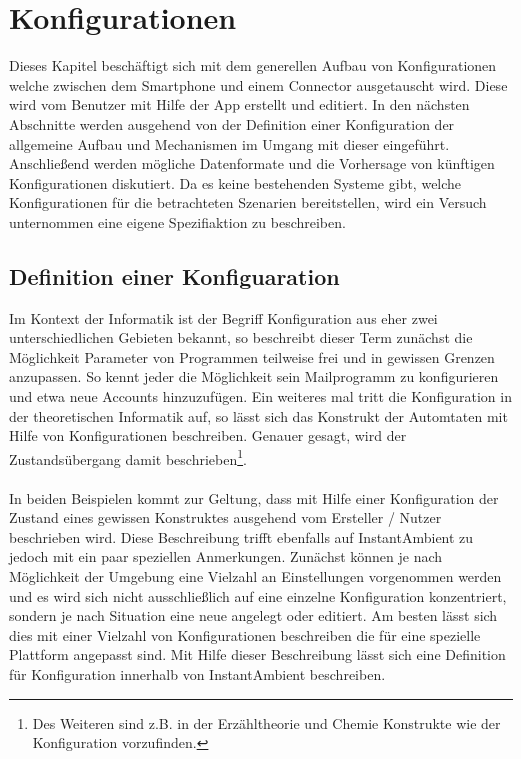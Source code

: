 \chapter{Konfigurationen}

Dieses Kapitel beschäftigt sich mit dem generellen Aufbau von Konfigurationen welche zwischen dem Smartphone und einem Connector ausgetauscht wird. Diese wird vom Benutzer
mit Hilfe der App erstellt und editiert. In den nächsten Abschnitte werden ausgehend von der Definition einer Konfiguration der allgemeine Aufbau und Mechanismen im Umgang
mit dieser eingeführt. Anschließend werden mögliche Datenformate und die Vorhersage von künftigen Konfigurationen diskutiert. Da es keine bestehenden Systeme gibt, welche 
Konfigurationen für die betrachteten Szenarien bereitstellen, wird ein Versuch unternommen eine eigene Spezifiaktion zu beschreiben.


\section{Definition einer Konfiguaration}
Im Kontext der Informatik ist der Begriff Konfiguration aus eher zwei unterschiedlichen Gebieten bekannt, so beschreibt dieser Term zunächst die Möglichkeit Parameter von
Programmen teilweise frei und in gewissen Grenzen anzupassen. So kennt jeder die Möglichkeit sein Mailprogramm zu konfigurieren und etwa neue Accounts hinzuzufügen. 
Ein weiteres mal tritt die Konfiguration in der theoretischen Informatik auf, so lässt sich das Konstrukt der Automtaten mit Hilfe von Konfigurationen beschreiben. Genauer
gesagt, wird der Zustandsübergang damit beschrieben\footnote{Des Weiteren sind z.B. in der Erzähltheorie und Chemie Konstrukte wie der Konfiguration vorzufinden. }. 
\\\\
In beiden Beispielen kommt zur Geltung, dass mit Hilfe einer Konfiguration der Zustand eines gewissen Konstruktes ausgehend vom Ersteller / Nutzer beschrieben wird. Diese
Beschreibung trifft ebenfalls auf InstantAmbient zu jedoch mit ein paar speziellen Anmerkungen. Zunächst können je nach Möglichkeit der Umgebung eine Vielzahl an 
Einstellungen vorgenommen werden und es wird sich nicht ausschließlich auf eine einzelne Konfiguration konzentriert, sondern je nach Situation eine neue angelegt oder editiert. Am 
besten lässt sich dies mit einer Vielzahl von Konfigurationen beschreiben die für eine spezielle Plattform angepasst sind. Mit Hilfe dieser Beschreibung lässt sich eine Definition für Konfiguration innerhalb von InstantAmbient beschreiben.

